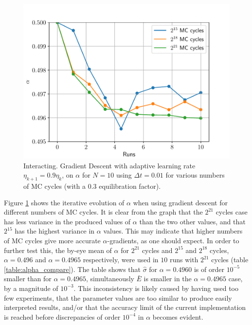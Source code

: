 \documentclass[%
oneside,                 %
final,                   %
10pt]{article}
\begin{document}
\begin{figure}[!h]
        \centering 
         \includegraphics[scale=0.6]{../Results/Data_analysis/GD_interacting.pdf} 
        \caption{Interacting. Gradient Descent with adaptive learning rate $\eta_{k+1}= 0.9\eta_{k} $, on $\alpha$ for $N=10$ using $\Delta t=0.01$ for various numbers of MC cycles (with a $0.3$ equilibration factor).}
        \label{fig:GD_interacting}   
\end{figure}  

Figure \ref{fig:GD_interacting} shows the iterative evolution of $\alpha$ when using gradient descent for different numbers of MC cycles. It is clear from the graph that the $2^{21}$ cycles case has less variance in the produced values of $\alpha$ than the two other values, and that $2^{15}$ has the highest variance in $\alpha$ values. This may indicate that higher numbers of MC cycles give more accurate $\alpha$-gradients, as one should expect. In order to further test this, the by-eye mean of $\alpha$ for $2^{21}$ cycles and $2^{15}$ and $2^{18}$ cycles, $\alpha=0.496$ and $\alpha=0.4965$ respectively, were used in $10$ runs with $2^{21}$ cycles (table \ref{table:alpha_compare}). The table shows that $\hat \sigma$ for $\alpha=0.4960$ is of order $10^{-5}$ 
smaller than for $\alpha=0.4965$, simultaneously $\bar E$ is smaller in the $\alpha=0.4965$ case, by a magnitude of $10^{-3}$. This inconsistency is likely caused by having used too few experiments, that the parameter values are too similar to produce easily interpreted results, and/or that the accuracy limit of the current implementation is reached before discrepancies of order $10^{-4}$ in $\alpha$ becomes evident. 
\end{document}

